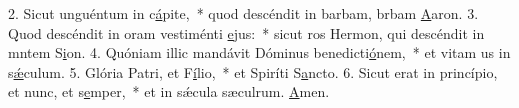 2. Sicut unguéntum in c\uline{á}pite,~* quod descéndit in barbam, brbam \uline{A}aron.
3. Quod descéndit in oram vestiménti \uline{e}jus:~* sicut ros Hermon, qui descéndit in mntem S\uline{i}on.
4. Quóniam illic mandávit Dóminus benedicti\uline{ó}nem,~* et vitam us in s\uline{ǽ}culum.
5. Glória Patri, et F\uline{í}lio,~* et Spiríti S\uline{a}ncto.
6. Sicut erat in princípio, et nunc, et s\uline{e}mper,~* et in sǽcula sæculrum. \uline{A}men.

